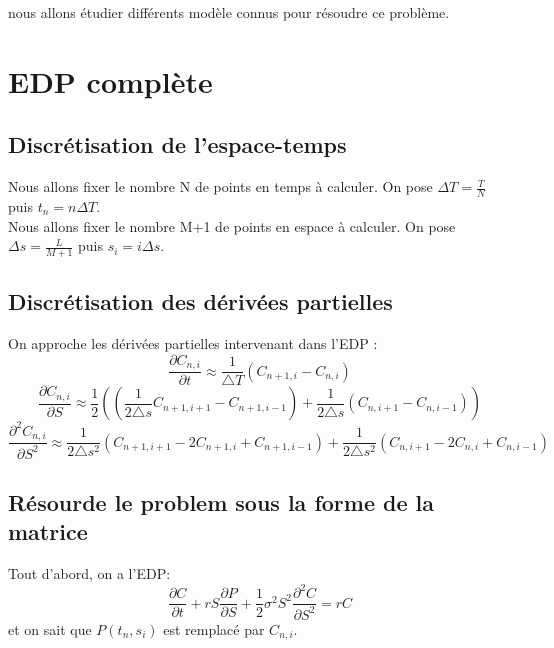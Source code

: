\documentclass[a4paper, 12pt]{article}
\begin{document}
  nous allons étudier différents modèle connus pour résoudre ce problème. 
		
	\newpage

\newpage
\section{EDP complète}

\subsection{Discrétisation de l’espace-temps}
Nous allons fixer le nombre N de points en temps à calculer. On pose $\Delta T =  \frac{T}{N}$ puis
$t_n = n \Delta T $.\\

Nous allons fixer le nombre M+1 de points en espace à calculer. On pose $\Delta s =  \frac{L}{M+1}$ puis
$s_i = i \Delta s $.

\subsection{Discrétisation des dérivées partielles}
On approche les dérivées partielles intervenant dans l'EDP :
\[
\frac{\partial C_{n,i}}{\partial t} \approx \frac{1}{\triangle T}\left(C_{n+1,i} - C_{n,i}\right)
\]
\[
\frac{\partial C_{n,i}}{\partial S} \approx \frac{1}{2}\left((\frac{1}{2\triangle s}C_{n+1,i+1} - C_{n+1,i-1}) + \frac{1}{2\triangle s}(C_{n,i+1} - C_{n,i-1})\right)
\]
\[\frac{\partial^2 C_{n,i}}{\partial S^2} \approx \frac{1}{2\triangle s^2}(C_{n+1,i+1} - 2C_{n+1,i} + C_{n+1,i-1}) + \frac{1}{2\triangle s^2}(C_{n,i+1} - 2C_{n,i} + C_{n,i-1})\]

\subsection{Résourde le problem sous la forme de la matrice}
Tout d'abord, on a l'EDP:
\[\frac{\partial C}{\partial t} + rS\frac{\partial P}{\partial S} + \frac{1}{2}\sigma^2S^2\frac{\partial^2 C}{\partial S^2} = rC\]
et on sait que $P(t_n,s_i)$ est remplacé par $C_{n,i}$.\\
\end{document}
